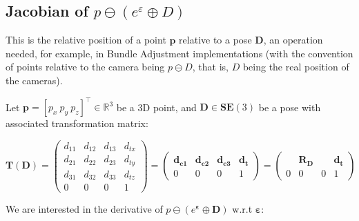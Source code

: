 \documentclass[a4paper,11pt]{report}
\newcommand{\E}{{\bm{\varepsilon}}}
\begin{document}
\subsection{Jacobian of $p \ominus (e^\varepsilon \oplus D) $}
\label{sect:jacob_eDp_inv}

This is the relative position of a point $\mathbf{p}$ relative to a pose $\mathbf{D}$, 
an operation needed, for example, in Bundle Adjustment implementations \cite{triggs2000bundle}
(with the convention of points relative to the camera being $p \ominus D$, that is, 
$D$ being the real position of the cameras).

Let $\mathbf{p} = [p_x ~ p_y ~ p_z]^\top \in \mathbb{R}^3$ be a 3D point, and 
$\mathbf{D} \in \mathbf{SE}(3)$ be a pose with associated transformation matrix:

\begin{equation}
\mathbf{T}(\mathbf{D}) = 
\left(
\begin{array}{ccc|c}
 d_{11} & d_{12} & d_{13} & d_{tx}   \\
 d_{21} & d_{22} & d_{23} & d_{ty}   \\
 d_{31} & d_{32} & d_{33} & d_{tz}   \\
\hline
  0 & 0 & 0 & 1
\end{array}
\right) 
=
\left(
\begin{array}{ccc|c}
 \mathbf{d_{c1}}  & \mathbf{d_{c2}}  & \mathbf{d_{c3}}  & \mathbf{d_{t}}  \\
\hline
  0 & 0 & 0 & 1
\end{array}
\right)
= 
\left(
\begin{array}{ccc|c}
   & \mathbf{R_D}  &  & \mathbf{d_{t}}  \\
\hline
  0 & 0 & 0 & 1
\end{array}
\right)
\end{equation}

We are interested in the derivative of $p \ominus (e^\E \oplus \mathbf{D})$ w.r.t $\E$:
\end{document}
